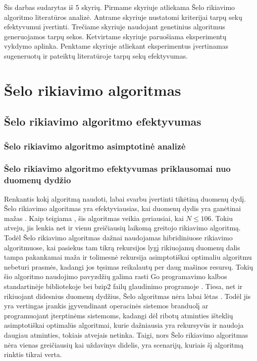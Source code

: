 \documentclass{VUMIFInfKursinis}
\begin{document}
Šis darbas sudarytas iš 5 skyrių.
Pirmame skyriuje atliekama Šelo rikiavimo algoritmo literatūros analizė.
Antrame skyriuje nustatomi kriterijai tarpų sekų efektyvumui įvertinti.
Trečiame skyriuje naudojant genetinius algoritmus generuojamos tarpų sekos.
Ketvirtame skyriuje paruošiama eksperimentų vykdymo aplinka.
Penktame skyriuje atliekant eksperimentus įvertinamas sugeneruotų ir pateiktų literatūroje tarpų sekų efektyvumas.

\section{Šelo rikiavimo algoritmas}

\subsection{Šelo rikiavimo algoritmo efektyvumas}

\subsubsection{Šelo rikiavimo algoritmo asimptotinė analizė}

\subsubsection{Šelo rikiavimo algoritmo efektyvumas priklausomai nuo duomenų dydžio}

Renkantis kokį algoritmą naudoti, labai svarbu įvertinti tikėtiną duomenų dydį.
Šelo rikiavimo algoritmas yra efektyviausias, kai duomenų dydis yra ganėtinai mažas \cite{ciura2001best}.
Kaip teigiama \cite{simpson1999faster}, šis algoritmas veikia geriausiai, kai $N \leq 106$.
Tokiu atveju, jis lenkia net ir vienu greičiausių laikomą greitojo rikiavimo algoritmą.
Todėl Šelo rikiavimo algoritmas dažnai naudojamas hibridiniuose rikiavimo algoritmuose, kai pasiekus tam tikrą rekursijos lygį
rikiuojamų duomenų dalis tampa pakankamai maža ir tolimesnė rekursija asimptotiškai optimaliu algoritmu nebeturi prasmės,
kadangi jos tęsimas reikalautų per daug mašinos resursų.
Tokių šio algoritmo naudojimo pavyzdžių galima rasti Go programavimo kalbos standartinėje bibliotekoje \cite{golangsort} bei
bzip2 failų glaudinimo programoje \cite{bzip2sort}.
Tiesa, net ir rikiuojant didesnius duomenų dydžius, Šelo algoritmas nėra labai lėtas \cite{ciura2001best}.
Todėl jis yra vertingas įrankis įgyvendinant operacinės sistemos branduolį ar programuojant įterptinėms sistemoms, kadangi dėl ribotų atminties išteklių
asimptotiškai optimalūs algoritmai, kurie dažniausia yra rekursyvūs ir naudoja daugiau atminties, tokiais atvejais netinka.
Taigi, nors Šelo rikiavimo algoritmas nėra vienas greičiausių kai uždavinys didelis,
yra scenarijų, kuriais šį algoritmą rinktis tikrai verta.
\end{document}
